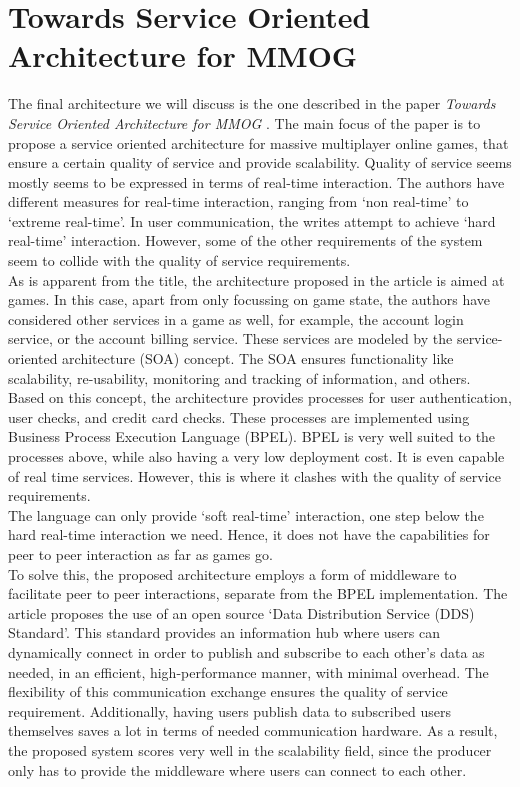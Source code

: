 \section*{Towards Service Oriented Architecture for MMOG}
The final architecture we will discuss is the one described in the paper \emph{Towards Service Oriented Architecture for MMOG} \cite{service}.
The main focus of the paper is to propose a service oriented architecture for massive multiplayer online games, that ensure a certain quality of service and provide scalability.
Quality of service seems mostly seems to be expressed in terms of real-time interaction.
The authors have different measures for real-time interaction, ranging from `non real-time' to `extreme real-time'.
In user communication, the writes attempt to achieve `hard real-time' interaction.
However, some of the other requirements of the system seem to collide with the quality of service requirements. \\

As is apparent from the title, the architecture proposed in the article is aimed at games.
In this case, apart from only focussing on game state, the authors have considered other services in a game as well, for example, the account login service, or the account billing service.
These services are modeled by the service-oriented architecture (SOA) concept.
The SOA ensures functionality like scalability, re-usability, monitoring and tracking of information, and others. \\
Based on this concept, the architecture provides processes for user authentication, user checks, and credit card checks.
These processes are implemented using Business Process Execution Language (BPEL).
BPEL is very well suited to the processes above, while also having a very low deployment cost.
It is even capable of real time services.
However, this is where it clashes with the quality of service requirements. \\
The language can only provide `soft real-time' interaction, one step below the hard real-time interaction we need.
Hence, it does not have the capabilities for peer to peer interaction as far as games go. \\

To solve this, the proposed architecture employs a form of middleware to facilitate peer to peer interactions, separate from the BPEL implementation.
The article proposes the use of an open source `Data Distribution Service (DDS) Standard'.
This standard provides an information hub where users can dynamically connect in order to publish and subscribe to each other's data as needed, in an efficient, high-performance manner, with minimal overhead.
The flexibility of this communication exchange ensures the quality of service requirement.
Additionally, having users publish data to subscribed users themselves saves a lot in terms of needed communication hardware. 
As a result, the proposed system scores very well in the scalability field, since the producer only has to provide the middleware where users can connect to each other. \\

